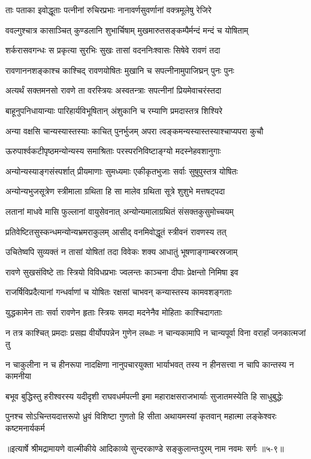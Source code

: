 \twolineshloka
{ताः पताका इवोद्धूताः पत्नीनां रुचिरप्रभाः}
{नानावर्णसुवर्णानां वक्त्रमूलेषु रेजिरे} %

\twolineshloka
{ववल्गुश्चात्र कासाञ्चित् कुण्डलानि शुभार्चिषाम्}
{मुखमारुतसङ्कम्पैर्मन्दं मन्दं च योषिताम्} %

\twolineshloka
{शर्करासवगन्धः स प्रकृत्या सुरभिः सुखः}
{तासां वदननिःश्वासः सिषेवे रावणं तदा} %

\twolineshloka
{रावणाननशङ्काश्च काश्चिद् रावणयोषितः}
{मुखानि च सपत्नीनामुपाजिघ्रन् पुनः पुनः} %

\twolineshloka
{अत्यर्थं सक्तमनसो रावणे ता वरस्त्रियः}
{अस्वतन्त्राः सपत्नीनां प्रियमेवाचरंस्तदा} %

\twolineshloka
{बाहूनुपनिधायान्याः पारिहार्यविभूषितान्}
{अंशुकानि च रम्याणि प्रमदास्तत्र शिश्यिरे} %

\twolineshloka
{अन्या वक्षसि चान्यस्यास्तस्याः काचित् पुनर्भुजम्}
{अपरा त्वङ्कमन्यस्यास्तस्याश्चाप्यपरा कुचौ} %

\twolineshloka
{ऊरुपार्श्वकटीपृष्ठमन्योन्यस्य समाश्रिताः}
{परस्परनिविष्टाङ्ग्यो मदस्नेहवशानुगाः} %

\twolineshloka
{अन्योन्यस्याङ्गसंस्पर्शात् प्रीयमाणाः सुमध्यमाः}
{एकीकृतभुजाः सर्वाः सुषुपुस्तत्र योषितः} %

\twolineshloka
{अन्योन्यभुजसूत्रेण स्त्रीमाला ग्रथिता हि सा}
{मालेव ग्रथिता सूत्रे शुशुभे मत्तषट्पदा} %

\twolineshloka
{लतानां माधवे मासि फुल्लानां वायुसेवनात्}
{अन्योन्यमालाग्रथितं संसक्तकुसुमोच्चयम्} %

\twolineshloka
{प्रतिवेष्टितसुस्कन्धमन्योन्यभ्रमराकुलम्}
{आसीद् वनमिवोद्धूतं स्त्रीवनं रावणस्य तत्} %

\twolineshloka
{उचितेष्वपि सुव्यक्तं न तासां योषितां तदा}
{विवेकः शक्य आधातुं भूषणाङ्गाम्बरस्रजाम्} %

\twolineshloka
{रावणे सुखसंविष्टे ताः स्त्रियो विविधप्रभाः}
{ज्वलन्तः काञ्चना दीपाः प्रेक्षन्तो निमिषा इव} %

\twolineshloka
{राजर्षिविप्रदैत्यानां गन्धर्वाणां च योषितः}
{रक्षसां चाभवन् कन्यास्तस्य कामवशङ्गताः} %

\twolineshloka
{युद्धकामेन ताः सर्वा रावणेन हृताः स्त्रियः}
{समदा मदनेनैव मोहिताः काश्चिदागताः} %

\twolineshloka
{न तत्र काश्चित् प्रमदाः प्रसह्य वीर्योपपन्नेन गुणेन लब्धाः}
{न चान्यकामापि न चान्यपूर्वा विना वरार्हां जनकात्मजां तु} %

\twolineshloka
{न चाकुलीना न च हीनरूपा नादक्षिणा नानुपचारयुक्ता}
{भार्याभवत् तस्य न हीनसत्त्वा न चापि कान्तस्य न कामनीया} %

\twolineshloka
{बभूव बुद्धिस्तु हरीश्वरस्य यदीदृशी राघवधर्मपत्नी}
{इमा महाराक्षसराजभार्याः सुजातमस्येति हि साधुबुद्धेः} %

\twolineshloka
{पुनश्च सोऽचिन्तयदात्तरूपो ध्रुवं विशिष्टा गुणतो हि सीता}
{अथायमस्यां कृतवान् महात्मा लङ्केश्वरः कष्टमनार्यकर्म} %


॥इत्यार्षे श्रीमद्रामायणे वाल्मीकीये आदिकाव्ये सुन्दरकाण्डे सङ्कुलान्तःपुरम् नाम नवमः सर्गः ॥५-९॥
